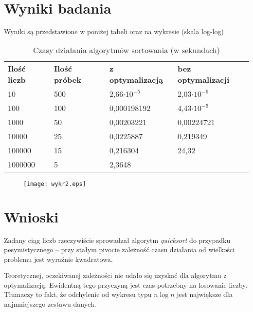 \documentclass[a4paper,10pt]{article}
\begin{document}
\section{Wyniki badania}

\par Wyniki są przedstawione w poniżej tabeli oraz na wykresie (skala 
log-log) 

\begin{center}
\begin{table}[h]
 
\caption{Czasy działania algorytmów sortowania (w sekundach)}

\begin{tabular}{llll}
\textbf{Ilość liczb} & \textbf{Ilość próbek} & \textbf{z optymalizacją} & \textbf{bez optymalizacji}\\
10 & 500 & 2,66\(\cdot 10^{-5}\) & 2,03\(\cdot 10^{-6}\)\\
100 & 100 & 0,000198192 & 4,43\(\cdot 10^{-5}\)\\
1000 & 50 & 0,00203221 & 0,00224721\\
10000 & 25 & 0,0225887 & 0,219349\\
100000 & 15 & 0,216304 & 24,32\\
1000000 & 5 & 2,3648 & 
\end{tabular}
\end{table}
\end{center}


\begin{figure}[h]
 \texttt{[image: wykr2.eps]}
\end{figure}

\section{Wnioski}

\par Zadany ciąg liczb rzeczywiście sprowadzał algorytm \textit{quicksort} do 
przypadku pesymistycznego -- przy stałym pivocie zależność czasu działania od wielkości problemu jest
wyraźnie kwadratowa.

\par Teoretycznej, oczekiwanej zależności nie udało się uzyskać dla algorytmu
z optymalizacją. Ewidentną tego przyczyną jest czas potrzebny na losowanie liczby.
Tłumaczy to fakt, że odchylenie od wykresu typu \(n \log n \) jest największe dla
najmniejszego zestawu danych.
\end{document}
